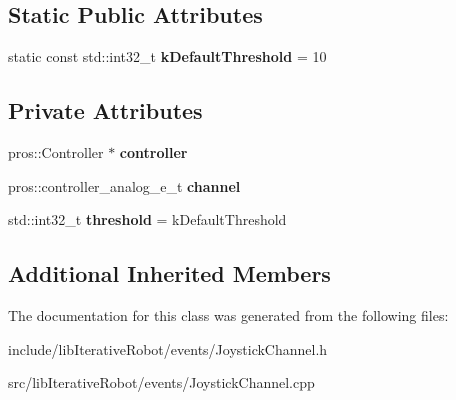 \subsection*{Static Public Attributes}
\begin{DoxyCompactItemize}
\item 
\mbox{\label{classlib_iterative_robot_1_1_joystick_channel_a29c1fe2a3e5d09fc47d9d7fc4f7b5288}} 
static const std\+::int32\+\_\+t {\bfseries k\+Default\+Threshold} = 10
\end{DoxyCompactItemize}
\subsection*{Private Attributes}
\begin{DoxyCompactItemize}
\item 
\mbox{\label{classlib_iterative_robot_1_1_joystick_channel_a78323bb91c0512d9c9c7b914fc710f65}} 
pros\+::\+Controller $\ast$ {\bfseries controller}
\item 
\mbox{\label{classlib_iterative_robot_1_1_joystick_channel_a2985ecdc2e4e6cd768b379abe7726aef}} 
pros\+::controller\+\_\+analog\+\_\+e\+\_\+t {\bfseries channel}
\item 
\mbox{\label{classlib_iterative_robot_1_1_joystick_channel_acc3695cfa13f8c1fca612d7d0803916e}} 
std\+::int32\+\_\+t {\bfseries threshold} = k\+Default\+Threshold
\end{DoxyCompactItemize}
\subsection*{Additional Inherited Members}


The documentation for this class was generated from the following files\+:\begin{DoxyCompactItemize}
\item 
include/lib\+Iterative\+Robot/events/Joystick\+Channel.\+h\item 
src/lib\+Iterative\+Robot/events/Joystick\+Channel.\+cpp\end{DoxyCompactItemize}
